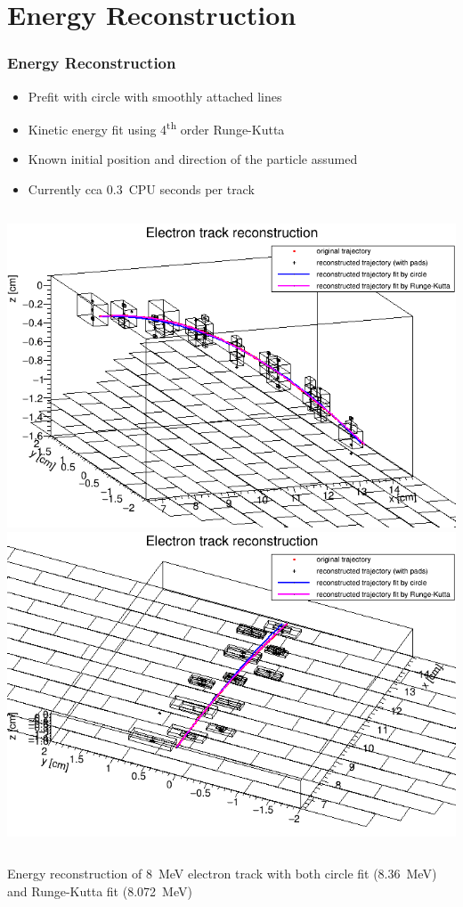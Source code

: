 \documentclass{beamer}
\begin{document}
	\section{Energy Reconstruction}
	\begin{frame}
		\frametitle{Energy Reconstruction}
		\begin{itemize}
			\item Prefit with circle with smoothly attached lines
			\item Kinetic energy fit using 4\textsuperscript{th} order Runge-Kutta
			\item Known initial position and direction of the particle assumed
			\item Currently cca 0.3~CPU seconds per track
		\end{itemize}
		\begin{columns}
				\centering
				\includegraphics[width=\textwidth]{../images/reco_track_pads2.png}\\
				\centering
				\includegraphics[width=\textwidth]{../images/reco_track_pads3.png}\\
		\end{columns}
		\vspace{0.5cm}
		\centering
		\begin{minipage}{0.8\textwidth}
			\centering
			\small{Energy reconstruction of 8~MeV electron track with both circle fit (8.36~MeV) and Runge-Kutta fit (8.072~MeV)}
		\end{minipage}
	\end{frame}
\end{document}
